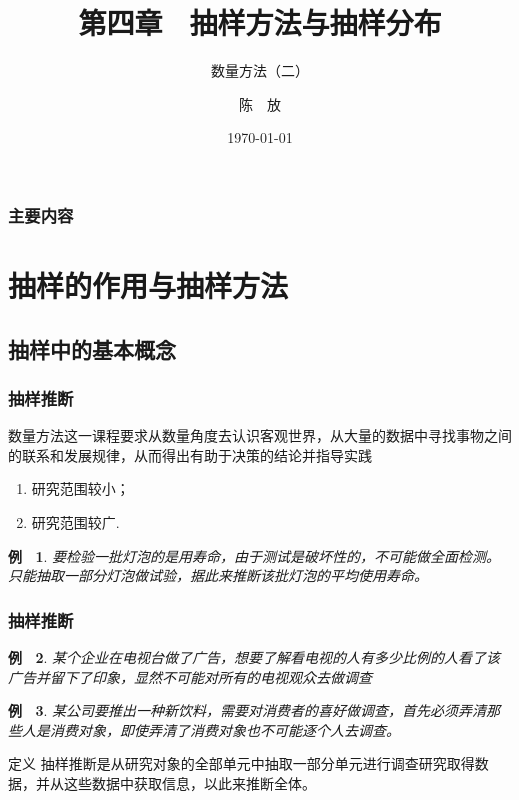 \documentclass[10pt,xcolor=dvipsnames,hyperref={CJKbookmarks=true}]{beamer}
\newtheorem{liti}{\heiti 例~}[section]
\begin{document}
\kaishu
\title[]{ 第四章~ 抽样方法与抽样分布}
\subtitle{数量方法（二）}
\author{陈\ \  放}
\date{\today}
\begin{frame}
  \titlepage
\end{frame}
\begin{frame}
  \frametitle{主要内容}
  \tableofcontents[pausesections]
\end{frame}

\section{抽样的作用与抽样方法}

\subsection{抽样中的基本概念}

\begin{frame}[c]
  \frametitle{抽样推断}
\begin{block}{数量方法这一课程要求从数量角度去认识客观世界，从大量的数据中寻找事物之间的联系和发展规律，从而得出有助于决策的结论并指导实践}
  
\begin{enumerate}
\item\label{item:1} 研究范围较小；
\item\label{item:2} 研究范围较广.
\end{enumerate}
\end{block}
\begin{liti}
  要检验一批灯泡的是用寿命，由于测试是破坏性的，不可能做全面检测。只能抽取一部分灯泡做试验，据此来推断该批灯泡的平均使用寿命。
\end{liti}
\end{frame}

\begin{frame}[c]
  \frametitle{抽样推断}
  \begin{liti}
    某个企业在电视台做了广告，想要了解看电视的人有多少比例的人看了该广告并留下了印象，显然不可能对所有的电视观众去做调查
  \end{liti}
  \begin{liti}
    某公司要推出一种新饮料，需要对消费者的喜好做调查，首先必须弄清那些人是消费对象，即使弄清了消费对象也不可能逐个人去调查。
  \end{liti}
  \begin{block}{定义}
    抽样推断是从研究对象的全部单元中抽取一部分单元进行调查研究取得数据，并从这些数据中获取信息，以此来推断全体。
  \end{block}
\end{frame}
\end{document}
